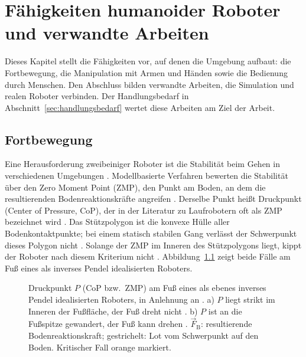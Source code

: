 \chapter{Fähigkeiten humanoider Roboter und verwandte Arbeiten}
\label{chap:faehigkeiten}
Dieses Kapitel stellt die Fähigkeiten vor, auf denen die Umgebung aufbaut: die Fortbewegung, die Manipulation mit Armen und Händen sowie die Bedienung durch Menschen.
Den Abschluss bilden verwandte Arbeiten, die Simulation und realen Roboter verbinden.
Der Handlungsbedarf in Abschnitt~\ref{sec:handlungsbedarf} wertet diese Arbeiten am Ziel der Arbeit.

\section{Fortbewegung}
\label{sec:fortbewegung_sdt}
Eine Herausforderung zweibeiniger Roboter ist die Stabilität beim Gehen in verschiedenen Umgebungen \cite{Saeedvand2019}.
Modellbasierte Verfahren bewerten die Stabilität über den Zero Moment Point (ZMP), den Punkt am Boden, an dem die resultierenden Bodenreaktionskräfte angreifen \cite{Saeedvand2019}.
Derselbe Punkt heißt Druckpunkt (Center of Pressure, CoP), der in der Literatur zu Laufrobotern oft als ZMP bezeichnet wird \cite{Westervelt2018}.
Das Stützpolygon ist die konvexe Hülle aller Bodenkontaktpunkte; bei einem statisch stabilen Gang verlässt der Schwerpunkt dieses Polygon nicht \cite{Westervelt2018}.
Solange der ZMP im Inneren des Stützpolygons liegt, kippt der Roboter nach diesem Kriterium nicht \cite{Westervelt2018}.
Abbildung~\ref{fig:zmp} zeigt beide Fälle am Fuß eines als inverses Pendel idealisierten Roboters.

\begin{figure}[htbp]
  \centering
  
  \caption[Druckpunkt und Stützpolygon am Fuß]{Druckpunkt $P$ (CoP bzw.\ ZMP) am Fuß eines als ebenes inverses Pendel idealisierten Roboters, in Anlehnung an \cite{Westervelt2018}\ev{*}. a) $P$ liegt strikt im Inneren der Fußfläche, der Fuß dreht nicht \cite{Westervelt2018}. b) $P$ ist an die Fußspitze gewandert, der Fuß kann drehen \cite{Westervelt2018}. $\vec{F}_\mathrm{B}$: resultierende Bodenreaktionskraft; gestrichelt: Lot vom Schwerpunkt auf den Boden. Kritischer Fall orange markiert.}
  \label{fig:zmp}
\end{figure}

